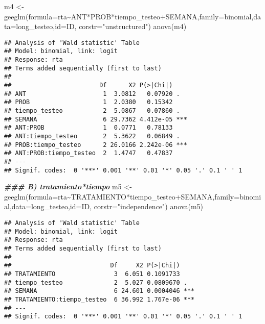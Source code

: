 \documentclass[
]{article}
\newenvironment{Shaded}{\begin{snugshade}}{\end{snugshade}}
\newcommand{\AttributeTok}[1]{\textcolor[rgb]{0.77,0.63,0.00}{#1}}
\newcommand{\DocumentationTok}[1]{\textcolor[rgb]{0.56,0.35,0.01}{\textbf{\textit{#1}}}}
\newcommand{\FunctionTok}[1]{\textcolor[rgb]{0.00,0.00,0.00}{#1}}
\newcommand{\NormalTok}[1]{#1}
\newcommand{\OtherTok}[1]{\textcolor[rgb]{0.56,0.35,0.01}{#1}}
\newcommand{\SpecialCharTok}[1]{\textcolor[rgb]{0.00,0.00,0.00}{#1}}
\newcommand{\StringTok}[1]{\textcolor[rgb]{0.31,0.60,0.02}{#1}}
\begin{document}
\begin{Shaded}
\begin{Highlighting}[]
\NormalTok{m4 }\OtherTok{\textless{}{-}} \FunctionTok{geeglm}\NormalTok{(}\AttributeTok{formula=}\NormalTok{rta}\SpecialCharTok{\textasciitilde{}}\NormalTok{ANT}\SpecialCharTok{*}\NormalTok{PROB}\SpecialCharTok{*}\NormalTok{tiempo\_testeo}\SpecialCharTok{+}\NormalTok{SEMANA,}\AttributeTok{family=}\NormalTok{binomial,}\AttributeTok{data=}\NormalTok{long\_testeo,}\AttributeTok{id=}\NormalTok{ID,}
             \AttributeTok{corstr=}\StringTok{"unstructured"}\NormalTok{)}
\FunctionTok{anova}\NormalTok{(m4)}
\end{Highlighting}
\end{Shaded}

\begin{verbatim}
## Analysis of 'Wald statistic' Table
## Model: binomial, link: logit
## Response: rta
## Terms added sequentially (first to last)
## 
##                        Df      X2 P(>|Chi|)    
## ANT                     1  3.0812   0.07920 .  
## PROB                    1  2.0380   0.15342    
## tiempo_testeo           2  5.0867   0.07860 .  
## SEMANA                  6 29.7362 4.412e-05 ***
## ANT:PROB                1  0.0771   0.78133    
## ANT:tiempo_testeo       2  5.3622   0.06849 .  
## PROB:tiempo_testeo      2 26.0166 2.242e-06 ***
## ANT:PROB:tiempo_testeo  2  1.4747   0.47837    
## ---
## Signif. codes:  0 '***' 0.001 '**' 0.01 '*' 0.05 '.' 0.1 ' ' 1
\end{verbatim}

\begin{Shaded}
\begin{Highlighting}[]
\DocumentationTok{\#\#\# B) tratamiento*tiempo}
\NormalTok{m5 }\OtherTok{\textless{}{-}} \FunctionTok{geeglm}\NormalTok{(}\AttributeTok{formula=}\NormalTok{rta}\SpecialCharTok{\textasciitilde{}}\NormalTok{TRATAMIENTO}\SpecialCharTok{*}\NormalTok{tiempo\_testeo}\SpecialCharTok{+}\NormalTok{SEMANA,}\AttributeTok{family=}\NormalTok{binomial,}\AttributeTok{data=}\NormalTok{long\_testeo,}\AttributeTok{id=}\NormalTok{ID,}
             \AttributeTok{corstr=}\StringTok{"independence"}\NormalTok{)}
\FunctionTok{anova}\NormalTok{(m5)}
\end{Highlighting}
\end{Shaded}

\begin{verbatim}
## Analysis of 'Wald statistic' Table
## Model: binomial, link: logit
## Response: rta
## Terms added sequentially (first to last)
## 
##                           Df     X2 P(>|Chi|)    
## TRATAMIENTO                3  6.051 0.1091733    
## tiempo_testeo              2  5.027 0.0809670 .  
## SEMANA                     6 24.601 0.0004046 ***
## TRATAMIENTO:tiempo_testeo  6 36.992 1.767e-06 ***
## ---
## Signif. codes:  0 '***' 0.001 '**' 0.01 '*' 0.05 '.' 0.1 ' ' 1
\end{verbatim}
\end{document}

